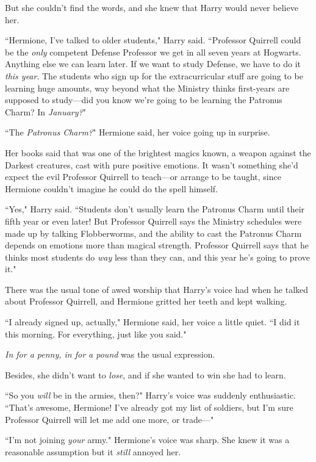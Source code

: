 But she couldn't find the words, and she knew that Harry would never believe her.

``Hermione, I've talked to older students," Harry said. ``Professor Quirrell could be the \emph{only} competent Defense Professor we get in all seven years at Hogwarts. Anything else we can learn later. If we want to study Defense, we have to do it \emph{this year}. The students who sign up for the extracurricular stuff are going to be learning huge amounts, way beyond what the Ministry thinks first-years are supposed to study---did you know we're going to be learning the Patronus Charm? In \emph{January?}"

``The \emph{Patronus Charm?}" Hermione said, her voice going up in surprise.

Her books said that was one of the brightest magics known, a weapon against the Darkest creatures, cast with pure positive emotions. It wasn't something she'd expect the evil Professor Quirrell to teach---or arrange to be taught, since Hermione couldn't imagine he could do the spell himself.

``Yes," Harry said. ``Students don't usually learn the Patronus Charm until their fifth year or even later! But Professor Quirrell says the Ministry schedules were made up by talking Flobberworms, and the ability to cast the Patronus Charm depends on emotions more than magical strength. Professor Quirrell says that he thinks most students do \emph{way} less than they can, and this year he's going to prove it."

There was the usual tone of awed worship that Harry's voice had when he talked about Professor Quirrell, and Hermione gritted her teeth and kept walking.

``I already signed up, actually," Hermione said, her voice a little quiet. ``I did it this morning. For everything, just like you said."

\emph{In for a penny, in for a pound} was the usual expression.

Besides, she didn't want to \emph{lose}, and if she wanted to win she had to learn.

``So you \emph{will} be in the armies, then?" Harry's voice was suddenly enthusiastic. ``That's awesome, Hermione! I've already got my list of soldiers, but I'm sure Professor Quirrell will let me add one more, or trade---"

``I'm not joining \emph{your} army." Hermione's voice was sharp. She knew it was a reasonable assumption but it \emph{still} annoyed her.

